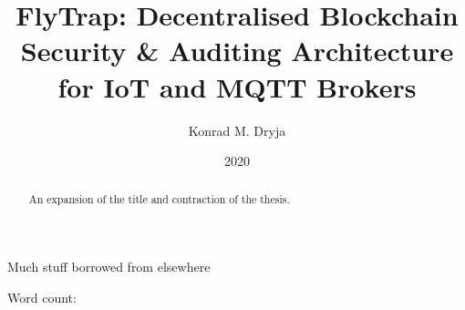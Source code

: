 \documentclass[msci]{abdnthesis}
\title{FlyTrap: Decentralised Blockchain Security \& Auditing Architecture for IoT and MQTT Brokers}
\author{Konrad M. Dryja}
\date{2020}
\begin{document}

\maketitle
\makedeclaration


\begin{abstract}
  An expansion of the title and contraction of the thesis.
\end{abstract}

\begin{acknowledgements}
  Much stuff borrowed from elsewhere
\end{acknowledgements}



\tableofcontents\vfill Word count:

\printnoidxglossary[type=\acronymtype,title=Abbreviations,nonumberlist]









\appendix




\end{document}
